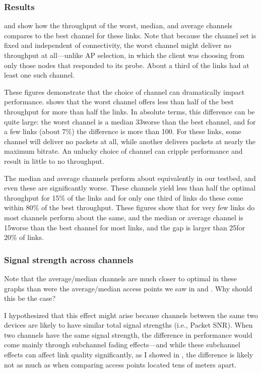 \subsubsection{Results}
 and  show how the throughput of the worst, median, and average channels compares to the best channel for these links. Note that because the channel set is fixed and independent of connectivity, the worst channel might deliver no throughput at all---unlike AP selection, in which the client was choosing from only those nodes that responded to its probe. About a third of the links had at least one such channel.

These figures demonstrate that the choice of channel can dramatically impact performance.  shows that the worst channel offers less than half of the best throughput for more than half the links. In absolute terms, this difference can be quite large: the worst channel is a median 33\Mbps worse than the best channel, and for a few links (about 7\%) the difference is more than 100\Mbps. For these links, some channel will deliver no packets at all, while another delivers packets at nearly the maximum bitrate. An unlucky choice of channel can cripple performance and result in little to no throughput.

The median and average channels perform about equivalently in our testbed, and even these are significantly worse. These channels yield less than half the optimal throughput for 15\% of the links and for only one third of links do these come within 80\% of the best throughput. These figures show that for very few links do most channels perform about the same, and the median or average channel is 15\Mbps worse than the best channel for most links, and the gap is larger than 25\Mbps for 20\% of links.

\subsubsection{Signal strength across channels}
Note that the average/median channels are much closer to optimal in these graphs than were the average/median access points we saw in  and . Why should this be the case?

I hypothesized that this effect might arise because channels between the same two devices are likely to have similar total signal strengths (i.e., Packet SNR). When two channels have the same signal strength, the difference in performance would come mainly through subchannel fading effects---and while these subchannel effects can affect link quality significantly, as I showed in , the difference is likely not as much as when comparing access points located tens of meters apart.

